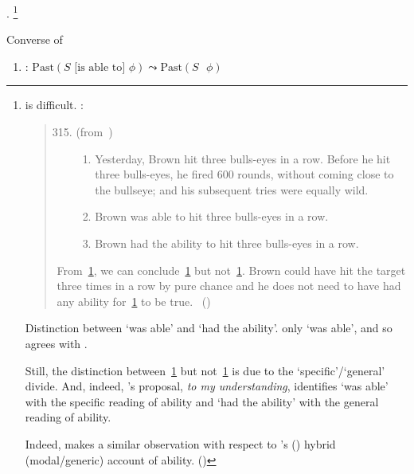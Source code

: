 \begin{note}
  \BoyPS{}.
  \footnote{
    \BoyPS{} is difficult.
    \textcite{Bhatt:2008wt}:
    \begin{quote}
      \begin{enumerate}[label=(\arabic*)]
        \setcounter{enumi}{314}
      \item
        (from~\cite{Thalberg:1969ta})
        \begin{enumerate}[label=\alph*., ref=(315\alph*)]
        \item
          \label{Bhatt:Thal-a}
          Yesterday, Brown hit three bulls-eyes in a row. Before he hit three bulls-eyes, he fired 600 rounds, without coming close to the bullseye; and his subsequent tries were equally wild.
        \item
          \label{Bhatt:Thal-b}
          Brown was able to hit three bulls-eyes in a row.
        \item
          \label{Bhatt:Thal-c}
          Brown had the ability to hit three bulls-eyes in a row.
        \end{enumerate}
      \end{enumerate}
      From~\ref{Bhatt:Thal-a}, we can conclude~\ref{Bhatt:Thal-b} but not~\ref{Bhatt:Thal-c}.
      Brown could have hit the target three times in a row by pure chance and he does not need to have had any ability for~\ref{Bhatt:Thal-b} to be true.%
      \mbox{ }\hfill\mbox{(\citeyear[167]{Bhatt:2008wt})}
    \end{quote}
    Distinction between `was able' and `had the ability'.
    \citeauthor{Boylan:2020aa} only `was able', and so agrees with \citeauthor{Bhatt:2008wt}.

    Still, the distinction between~\ref{Bhatt:Thal-b} but not~\ref{Bhatt:Thal-c} is due to the `specific'/`general' divide.
    And, indeed, \citeauthor{Bhatt:2008wt}'s proposal, \emph{to my understanding}, identifies `was able' with the specific reading of ability and `had the ability' with the general reading of ability.

    Indeed, \citeauthor{Boylan:2020aa} makes a similar observation with respect to \citeauthor{Maier:2018uo}'s (\citeyear{Maier:2018uo}) hybrid (modal/generic) account of ability. (\citeyear[23, fn.3]{Boylan:2020aa})
  }

  Converse of \BoyPS{}

  \begin{enumerate}[label=]
  \item
    \label{Boylan:Past-Success:C}
    \BoyPSC{}: \(\text{Past}(S\text{ [is able to] }\phi) \leadsto \text{Past}(S\text{ }\phi)\)
  \end{enumerate}


\end{note}
